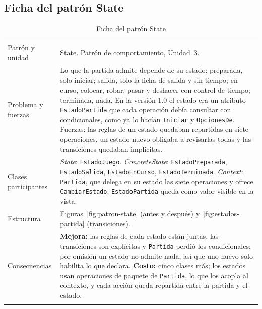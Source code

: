 
\clearpage
\subsection{Ficha del patrón State}\label{sec:ficha-state}

{\small{}\renewcommand{\arraystretch}{1.2}
\begin{longtable}{@{}L{3.1cm}L{11.4cm}@{}}
  \caption{Ficha del patrón State}\label{tab:ficha-state}\\
  \toprule
   &  \\ \midrule \endfirsthead
  \toprule
   &  \\ \midrule \endhead
  \bottomrule \endlastfoot
  Patrón y unidad & State. Patrón de comportamiento, Unidad~3. \\ \filasep
  Problema y fuerzas & Lo que la partida admite depende de su estado: preparada, solo iniciar; salida, solo la ficha de salida y sin tiempo; en curso, colocar, robar, pasar y deshacer con control de tiempo; terminada, nada. En la versión 1.0 el estado era un atributo \texttt{EstadoPartida} que cada operación debía consultar con condicionales, como ya lo hacían \texttt{Iniciar} y \texttt{OpcionesDe}. Fuerzas: las reglas de un estado quedaban repartidas en siete operaciones, un estado nuevo obligaba a revisarlas todas y las transiciones quedaban implícitas. \\ \filasep
  Clases participantes & \emph{State}: \texttt{EstadoJuego}. \emph{ConcreteState}: \texttt{EstadoPreparada}, \texttt{EstadoSalida}, \texttt{EstadoEnCurso}, \texttt{EstadoTerminada}. \emph{Context}: \texttt{Partida}, que delega en su estado las siete operaciones y ofrece \texttt{CambiarEstado}. \texttt{EstadoPartida} queda como valor visible en la vista. \\ \filasep
  Estructura & Figuras~\ref{fig:patron-state} (antes y después) y~\ref{fig:estados-partida} (transiciones). \\ \filasep
  Consecuencias & \textbf{Mejora:} las reglas de cada estado están juntas, las transiciones son explícitas y \texttt{Partida} perdió los condicionales; por omisión un estado no admite nada, así que uno nuevo solo habilita lo que declara. \textbf{Costo:} cinco clases más; los estados usan operaciones de paquete de \texttt{Partida}, lo que los acopla al contexto, y cada acción queda repartida entre la partida y el estado. \\ \filasep

\end{longtable}}

